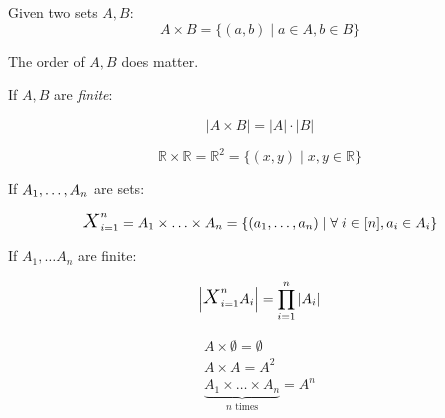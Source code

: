 \documentclass[00_complete]{subfiles}
\begin{document}
\begin{definition}
Given two sets $A,B$:
$$A \times B = \{(a,b) \mid a \in A, b \in B\}$$
\begin{note}
The order of $A, B$ does matter.
\end{note}
\end{definition}

If $A, B$ are \emph{finite}:

$$|A \times B| = |A| \cdot |B|$$

\begin{definition}[Plane]
$$\mathbb{R} \times \mathbb{R} = \mathbb{R}^2 = \{(x,y) \mid x, y \in \mathbb{R}\}$$
\end{definition}

If $A_1, \mathellipsis, A_n$ are sets:

$$\text{\Large{$X$}}_{i=1}^n = A_1 \times \mathellipsis \times A_n = \{(a_1, \mathellipsis,
a_n) \mid \forall \; i \in [n], a_i \in A_i\}$$

If $A_1, \ldots A_n$ are finite:

$$\left|\text{\Large{$X$}}_{i=1}^n A_i\right| = \prod_{i=1}^n |A_i|$$

\begin{definition}[Characteristics]
\begin{gather*}
    A \times \emptyset = \emptyset \\
    A \times A = A^2 \\
    \underbrace{A_1 \times \ldots \times A_n}_{n\text{ times}} = A^n
\end{gather*}
\end{definition}
\end{document}
